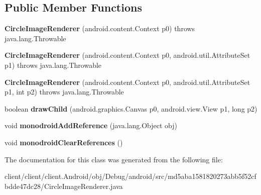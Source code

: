 \subsection*{Public Member Functions}
\begin{DoxyCompactItemize}
\item 
\hypertarget{classmd5aba1581820273abb5f52cfbdde47dc28_1_1CircleImageRenderer_aefad9aa5b828f55fd0316791f2162872}{}{\bfseries Circle\+Image\+Renderer} (android.\+content.\+Context p0)  throws java.\+lang.\+Throwable 	\label{classmd5aba1581820273abb5f52cfbdde47dc28_1_1CircleImageRenderer_aefad9aa5b828f55fd0316791f2162872}

\item 
\hypertarget{classmd5aba1581820273abb5f52cfbdde47dc28_1_1CircleImageRenderer_ab840917951f64f71c0aef88cbdd0f9e5}{}{\bfseries Circle\+Image\+Renderer} (android.\+content.\+Context p0, android.\+util.\+Attribute\+Set p1)  throws java.\+lang.\+Throwable 	\label{classmd5aba1581820273abb5f52cfbdde47dc28_1_1CircleImageRenderer_ab840917951f64f71c0aef88cbdd0f9e5}

\item 
\hypertarget{classmd5aba1581820273abb5f52cfbdde47dc28_1_1CircleImageRenderer_aa0a1c2a48b12b90aa9859ce1e8c0f397}{}{\bfseries Circle\+Image\+Renderer} (android.\+content.\+Context p0, android.\+util.\+Attribute\+Set p1, int p2)  throws java.\+lang.\+Throwable 	\label{classmd5aba1581820273abb5f52cfbdde47dc28_1_1CircleImageRenderer_aa0a1c2a48b12b90aa9859ce1e8c0f397}

\item 
\hypertarget{classmd5aba1581820273abb5f52cfbdde47dc28_1_1CircleImageRenderer_a653d0f626925e60dcaf33a7270117d7a}{}boolean {\bfseries draw\+Child} (android.\+graphics.\+Canvas p0, android.\+view.\+View p1, long p2)\label{classmd5aba1581820273abb5f52cfbdde47dc28_1_1CircleImageRenderer_a653d0f626925e60dcaf33a7270117d7a}

\item 
\hypertarget{classmd5aba1581820273abb5f52cfbdde47dc28_1_1CircleImageRenderer_a92e2a6d7bfb4ef1f03b1da80245e9d3b}{}void {\bfseries monodroid\+Add\+Reference} (java.\+lang.\+Object obj)\label{classmd5aba1581820273abb5f52cfbdde47dc28_1_1CircleImageRenderer_a92e2a6d7bfb4ef1f03b1da80245e9d3b}

\item 
\hypertarget{classmd5aba1581820273abb5f52cfbdde47dc28_1_1CircleImageRenderer_a9934fff3181e62ce838fcae319b1726e}{}void {\bfseries monodroid\+Clear\+References} ()\label{classmd5aba1581820273abb5f52cfbdde47dc28_1_1CircleImageRenderer_a9934fff3181e62ce838fcae319b1726e}

\end{DoxyCompactItemize}


The documentation for this class was generated from the following file\+:\begin{DoxyCompactItemize}
\item 
client/client/client.\+Android/obj/\+Debug/android/src/md5aba1581820273abb5f52cfbdde47dc28/Circle\+Image\+Renderer.\+java\end{DoxyCompactItemize}
